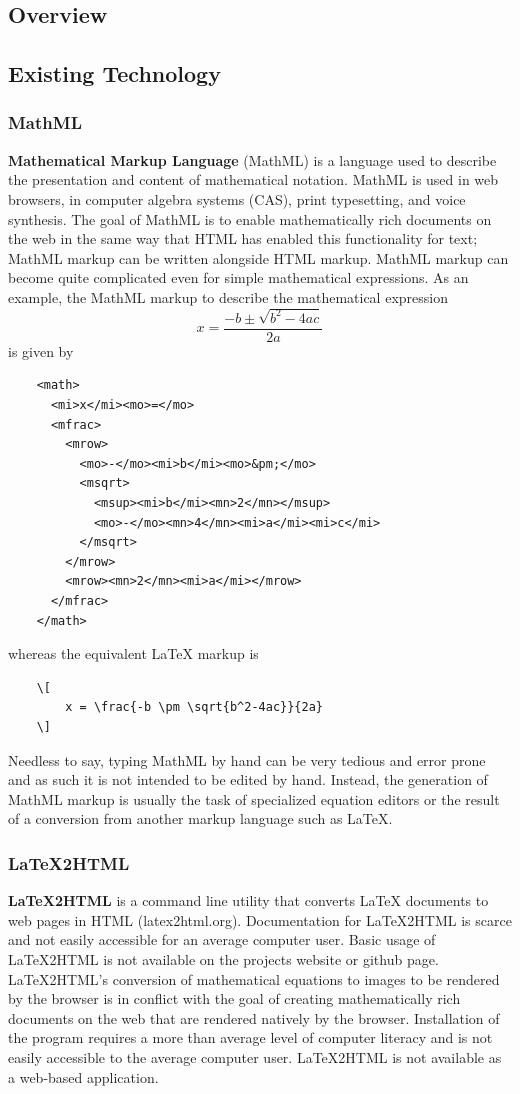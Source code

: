 \documentclass[11pt]{article}
\begin{document}
\subsection{Overview}

\subsection{Existing Technology}

\subsubsection{MathML}
\textbf{Mathematical Markup Language} (MathML) is a language used to describe the presentation and content of mathematical notation.  MathML is used in web browsers, in computer algebra systems (CAS), print typesetting, and voice synthesis.  The goal of MathML is to enable mathematically rich documents on the web in the same way that HTML has enabled this functionality for text; MathML markup can be written alongside HTML markup.  MathML markup can become quite complicated even for simple mathematical expressions.  As an example, the MathML markup to describe the mathematical expression
\[
x = \frac{-b \pm\sqrt{b^2-4ac}}{2a}
\]
is given by
\begin{verbatim}
    <math>
      <mi>x</mi><mo>=</mo>
      <mfrac>
        <mrow>
          <mo>-</mo><mi>b</mi><mo>&pm;</mo>
          <msqrt>
            <msup><mi>b</mi><mn>2</mn></msup>
            <mo>-</mo><mn>4</mn><mi>a</mi><mi>c</mi>
          </msqrt>
        </mrow>
        <mrow><mn>2</mn><mi>a</mi></mrow>
      </mfrac>
    </math>
\end{verbatim}
whereas the equivalent LaTeX markup is
\begin{verbatim}
    \[
        x = \frac{-b \pm \sqrt{b^2-4ac}}{2a}
    \]
\end{verbatim}
Needless to say, typing MathML by hand can be very tedious and error prone and as such it is not intended to be edited by hand.  Instead, the generation of MathML markup is usually the task of specialized equation editors or the result of a conversion from another markup language such as LaTeX.
 
\subsubsection{LaTeX2HTML}
\textbf{LaTeX2HTML} is a command line utility that converts LaTeX documents to web pages in HTML (latex2html.org).  Documentation for LaTeX2HTML is scarce and not easily accessible for an average computer user.  Basic usage of LaTeX2HTML is not available on the projects website or github page. LaTeX2HTML's conversion of mathematical equations to images to be rendered by the browser is in conflict with the goal of creating mathematically rich documents on the web that are rendered natively by the browser.  Installation of the program requires a more than average level of computer literacy and is not easily accessible to the average computer user.  LaTeX2HTML is not available as a web-based application.
\end{document}

